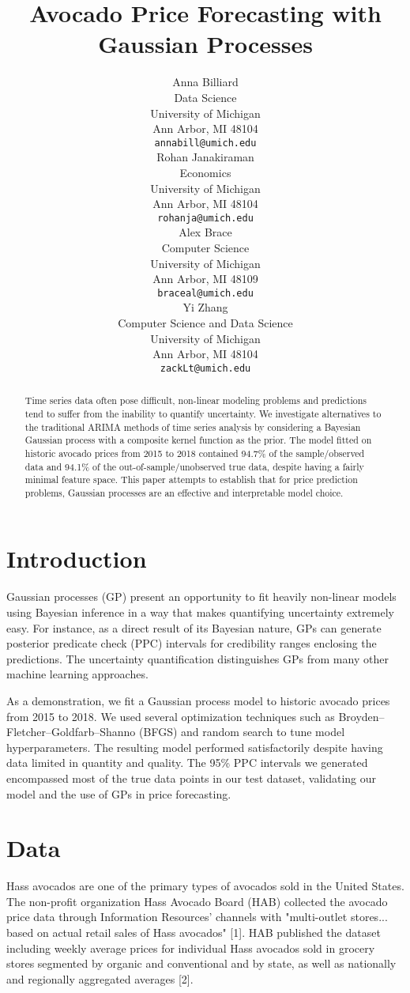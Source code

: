 \documentclass{article}
\title{Avocado Price Forecasting with Gaussian Processes}
\author{%
  Anna Billiard  \\
  Data Science\\
  University of Michigan\\
  Ann Arbor, MI 48104 \\
  \texttt{annabill@umich.edu} \\
  \And Rohan Janakiraman \\
  Economics\\
  University of Michigan\\
  Ann Arbor, MI 48104 \\
  \texttt{rohanja@umich.edu} \\
  \AND Alex Brace \\
  Computer Science\\
  University of Michigan\\
  Ann Arbor, MI 48109 \\
  \texttt{braceal@umich.edu} \\
  \And Yi Zhang \\
  Computer Science and Data Science\\
  University of Michigan\\
  Ann Arbor, MI 48104 \\
  \texttt{zackLt@umich.edu} \\
}
\newcommand{\outOfCIPtcTrain}{94.7\%}
\newcommand{\outOfCIPtcTest}{94.1\%}
\begin{document}
\maketitle
\begin{abstract}
Time series data often pose difficult, non-linear modeling problems and predictions tend to suffer from the inability to quantify uncertainty. We investigate alternatives to the traditional ARIMA methods of time series analysis by considering a Bayesian Gaussian process with a composite kernel function as the prior. The model fitted on historic avocado prices from 2015 to 2018 contained \outOfCIPtcTrain{} of the sample/observed data and \outOfCIPtcTest{} of the out-of-sample/unobserved true data, despite having a fairly minimal feature space. This paper attempts to establish that for price prediction problems, Gaussian processes are an effective and interpretable model choice. 
\end{abstract}

\section{Introduction}
Gaussian processes (GP) present an opportunity to fit heavily non-linear models using Bayesian inference in a way that makes quantifying uncertainty extremely easy. For instance, as a direct result of its Bayesian nature, GPs can generate posterior predicate check (PPC) intervals for credibility ranges enclosing the predictions. The uncertainty quantification distinguishes GPs from many other machine learning approaches.

As a demonstration, we fit a Gaussian process model to historic avocado prices from 2015 to 2018. We used several optimization techniques such as Broyden–Fletcher–Goldfarb–Shanno (BFGS) and random search to tune model hyperparameters. The resulting model performed satisfactorily despite having data limited in quantity and quality. The 95\% PPC intervals we generated encompassed most of the true data points in our test dataset, validating our model and the use of GPs in price forecasting.

\section{Data}
   Hass avocados are one of the primary types of avocados sold in the United States. The non-profit organization Hass Avocado Board (HAB) collected the avocado price data through Information Resources' channels with "multi-outlet stores... based on actual retail sales of Hass avocados" [1]. HAB published the dataset including weekly average prices for individual Hass avocados sold in grocery stores segmented by organic and conventional and by state, as well as nationally and regionally aggregated averages [2].
   
\end{document}
